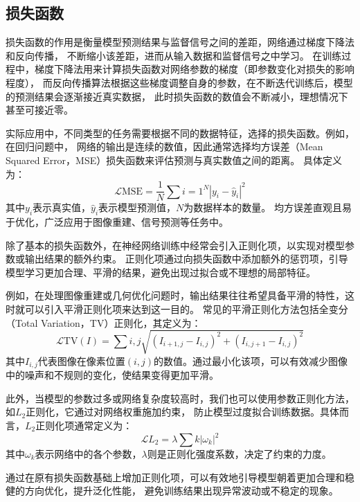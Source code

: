 \subsection{损失函数}

损失函数的作用是衡量模型预测结果与监督信号之间的差距，网络通过梯度下降法和反向传播，
不断缩小该差距，进而从输入数据和监督信号之中学习。
在训练过程中，梯度下降法用来计算损失函数对网络参数的梯度（即参数变化对损失的影响程度），
而反向传播算法根据这些梯度调整自身的参数，在不断迭代训练后，模型的预测结果会逐渐接近真实数据，
此时损失函数的数值会不断减小，理想情况下甚至可接近零。

实际应用中，不同类型的任务需要根据不同的数据特征，选择的损失函数。例如，在回归问题中，
网络的输出是连续的数值，因此通常选择均方误差（Mean Squared Error，MSE）损失函数来评估预测与真实数值之间的距离。
具体定义为：
\begin{equation} 
  \mathcal{L}{\text{MSE}}=\frac{1}{N}\sum{i=1}^{N}\left|y_i - \hat{y}_i\right|^2 
\end{equation}
其中$y_i$表示真实值，$\hat{y}_i$表示模型预测值，$N$为数据样本的数量。
均方误差直观且易于优化，广泛应用于图像重建、信号预测等任务中。

除了基本的损失函数外，在神经网络训练中经常会引入正则化项，以实现对模型参数或输出结果的额外约束。
正则化项通过向损失函数中添加额外的惩罚项，引导模型学习更加合理、平滑的结果，避免出现过拟合或不理想的局部特征。

例如，在处理图像重建或几何优化问题时，输出结果往往希望具备平滑的特性，这时就可以引入平滑正则化项来达到这一目的。
常见的平滑正则化方法包括全变分（Total Variation，TV）正则化，其定义为：
\begin{equation} 
  \mathcal{L}{\text{TV}}(I)=\sum{i,j}\sqrt{\left(I_{i+1,j}-I_{i,j}\right)^2+\left(I_{i,j+1}-I_{i,j}\right)^2} 
\end{equation} 
其中$I_{i,j}$代表图像在像素位置$(i,j)$的数值。通过最小化该项，可以有效减少图像中的噪声和不规则的变化，使结果变得更加平滑。

此外，当模型的参数过多或网络复杂度较高时，我们也可以使用参数正则化方法，如$L_2$正则化，它通过对网络权重施加约束，
防止模型过度拟合训练数据。具体而言，$L_2$正则化项通常定义为： \begin{equation} \mathcal{L}{L_2}=\lambda\sum{k}\left|\omega_k\right|^2 \end{equation} 其中$\omega_k$表示网络中的各个参数，$\lambda$则是正则化强度系数，决定了约束的力度。

通过在原有损失函数基础上增加正则化项，可以有效地引导模型朝着更加合理和稳健的方向优化，提升泛化性能，
避免训练结果出现异常波动或不稳定的现象。

